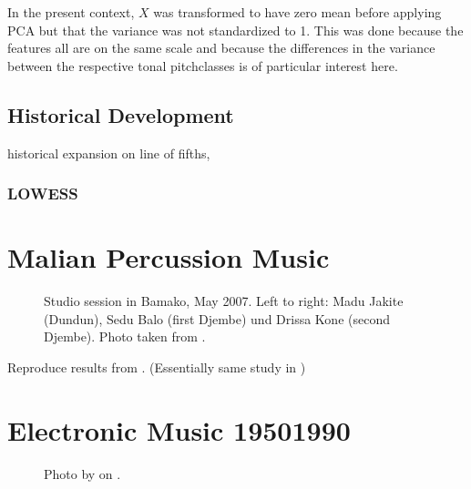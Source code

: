 \documentclass[letterpaper,10pt,english]{sphinxmanual}
\begin{document}
In the present context, \(X\) was transformed to have zero mean before applying PCA
but that the variance was not standardized to 1.
This was done because the features all are on the same scale and because the
differences in the variance between the respective tonal pitch\sphinxhyphen{}classes is of particular
interest here.


\section{Historical Development}
\label{\detokenize{tonality:historical-development}}
historical expansion on line of fifths,


\subsection{LOWESS}
\label{\detokenize{tonality:lowess}}

\chapter{Malian Percussion Music}
\label{\detokenize{mali_percussion:malian-percussion-music}}\label{\detokenize{mali_percussion::doc}}
\begin{figure}[htbp]
\centering
\capstart

\noindent{}
\caption{Studio session in Bamako, May 2007.
Left to right: Madu Jakite (Dundun), Sedu Balo (first Djembe) und Drissa Kone (second Djembe).
Photo taken from .}\label{\detokenize{mali_percussion:id3}}\end{figure}

Reproduce results from .  (Essentially same study in )


\chapter{Electronic Music 1950\textendash{}1990}
\label{\detokenize{electronic:electronic-music-1950-1990}}\label{\detokenize{electronic::doc}}
\begin{figure}[htbp]
\centering
\capstart

\noindent{}
\caption{Photo by 
on .}\label{\detokenize{electronic:id1}}\end{figure}
\end{document}
